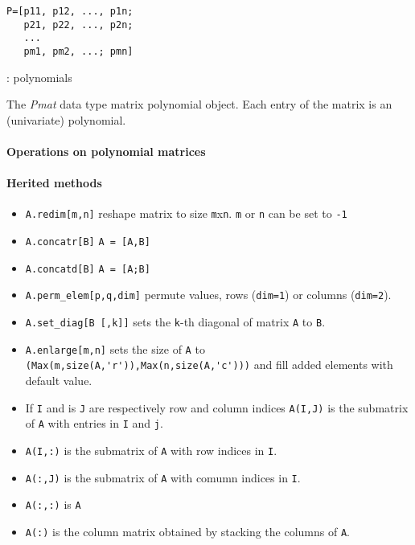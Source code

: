 
\begin{mandesc}
\end{mandesc}
\begin{calling_sequence}
\begin{verbatim}
P=[p11, p12, ..., p1n;
   p21, p22, ..., p2n;
   ...
   pm1, pm2, ...; pmn]
\end{verbatim}
\end{calling_sequence}
\begin{parameters}
  \begin{varlist}
    : polynomials
  \end{varlist}
\end{parameters}

\begin{mandescription}
The \emph{Pmat} data type matrix polynomial object. 
Each entry of the matrix is an (univariate) polynomial.
\end{mandescription}

\paragraph{Operations on polynomial matrices}
\paragraph{Herited methods}
\begin{itemize}
\item \verb+A.redim[m,n]+ reshape matrix to size \verb+m+x\verb+n+. \verb+m+ or \verb+n+ can be set to \verb+-1+ 
\item \verb+A.concatr[B]+ \verb+A = [A,B]+
\item \verb+A.concatd[B]+ \verb+A = [A;B]+
\item \verb+A.perm_elem[p,q,dim]+ permute values, rows (\verb+dim=1+) or columns (\verb+dim=2+).
\item \verb+A.set_diag[B [,k]]+ sets the \verb+k+-th diagonal of matrix \verb+A+ to \verb+B+.
\item \verb+A.enlarge[m,n]+ sets the size of \verb+A+ to \verb+(Max(m,size(A,'r')),Max(n,size(A,'c')))+ and fill 
  added elements with default value.
\end{itemize}

\begin{itemize}
   \item If \verb+I+ and is \verb+J+ are respectively row and column indices \verb+A(I,J)+ is the submatrix of \verb+A+ with entries in \verb+I+ and \verb+j+.
   \item \verb+A(I,:)+ is the submatrix of \verb+A+ with row indices in \verb+I+.
   \item \verb+A(:,J)+ is the submatrix of \verb+A+ with comumn indices in \verb+I+.
   \item \verb+A(:,:)+ is \verb+A+
   \item \verb+A(:)+  is the column matrix obtained by stacking the columns of \verb+A+.
\end{itemize}

